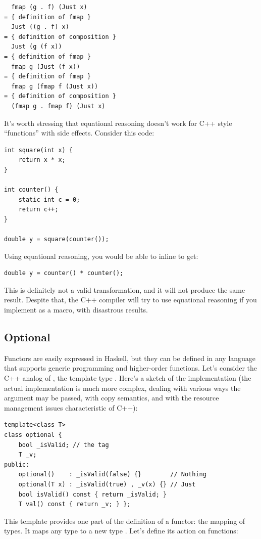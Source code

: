 \begin{Verbatim}
  fmap (g . f) (Just x)
= { definition of fmap }
  Just ((g . f) x)
= { definition of composition }
  Just (g (f x))
= { definition of fmap }
  fmap g (Just (f x))
= { definition of fmap }
  fmap g (fmap f (Just x))
= { definition of composition }
  (fmap g . fmap f) (Just x)
\end{Verbatim}
It's worth stressing that equational reasoning doesn't work for C++
style ``functions'' with side effects. Consider this code:

\begin{Verbatim}
int square(int x) { 
    return x * x;
}

int counter() { 
    static int c = 0;
    return c++;
}

double y = square(counter());
\end{Verbatim}
Using equational reasoning, you would be able to inline 
to get:

\begin{Verbatim}
double y = counter() * counter();
\end{Verbatim}
This is definitely not a valid transformation, and it will not produce
the same result. Despite that, the C++ compiler will try to use
equational reasoning if you implement  as a macro, with
disastrous results.

\subsection{Optional}

Functors are easily expressed in Haskell, but they can be defined in any
language that supports generic programming and higher-order functions.
Let's consider the C++ analog of , the template type
. Here's a sketch of the implementation (the actual
implementation is much more complex, dealing with various ways the
argument may be passed, with copy semantics, and with the resource
management issues characteristic of C++):

\begin{Verbatim}
template<class T>
class optional { 
    bool _isValid; // the tag
    T _v;
public:
    optional()    : _isValid(false) {}        // Nothing
    optional(T x) : _isValid(true) , _v(x) {} // Just
    bool isValid() const { return _isValid; }
    T val() const { return _v; } };
\end{Verbatim}
This template provides one part of the definition of a functor: the
mapping of types. It maps any type  to a new type
. Let's define its action on
functions:


